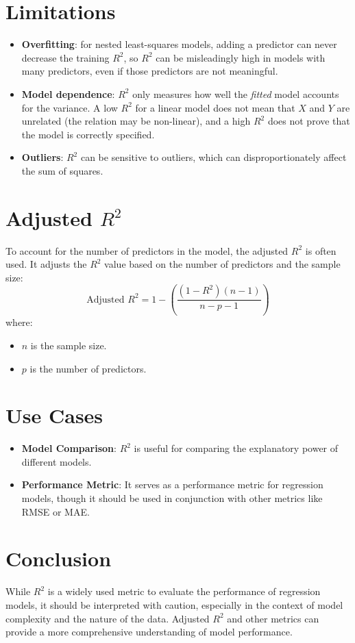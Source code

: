 \begin{notechapter}
\section{Limitations}
\begin{itemize}
        \item \textbf{Overfitting}: for nested least-squares models, adding a
          predictor can never decrease the training \( R^2 \), so
          \( R^2 \) can be misleadingly high in models with many
          predictors, even if those predictors are not meaningful.
    \item \textbf{Model dependence}: \( R^2 \) only measures how well the
          \emph{fitted} model accounts for the variance. A low \( R^2 \)
          for a linear model does not mean that \( X \) and \( Y \) are
          unrelated (the relation may be non-linear), and a high \( R^2 \)
          does not prove that the model is correctly specified.
    \item \textbf{Outliers}: \( R^2 \) can be sensitive to outliers, 
          which can disproportionately affect the sum of squares.
\end{itemize}

\section{Adjusted \( R^2 \)}
To account for the number of predictors in the model, the adjusted \( R^2 \) 
is often used. It adjusts the \( R^2 \) value based on the number of 
predictors and the sample size:
\[
\text{Adjusted } R^2 = 1 - \left( \frac{(1 - R^2)(n - 1)}{n - p - 1} \right)
\]
where:
\begin{itemize}
    \item \( n \) is the sample size.
    \item \( p \) is the number of predictors.
\end{itemize}

\section{Use Cases}
\begin{itemize}
    \item \textbf{Model Comparison}: \( R^2 \) is useful for comparing 
          the explanatory power of different models.
    \item \textbf{Performance Metric}: It serves as a performance metric 
          for regression models, though it should be used in conjunction 
          with other metrics like RMSE or MAE.
\end{itemize}

\section{Conclusion}
While \( R^2 \) is a widely used metric to evaluate the performance of 
regression models, it should be interpreted with caution, especially in 
the context of model complexity and the nature of the data. Adjusted \( R^2 \) 
and other metrics can provide a more comprehensive understanding of 
model performance.
\end{notechapter}
